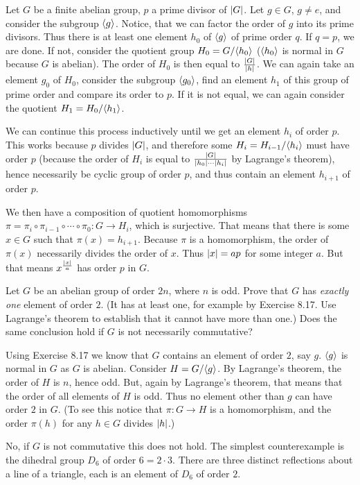 \begin{solution}
	Let $G$ be a finite abelian group, $p$ a prime divisor of $\left|G\right|$. Let $g \in G$, $g \neq e$, and consider the subgroup $\langle g \rangle$. Notice, that we can factor the order of $g$ into its prime divisors. Thus there is at least one element $h_0$ of $\langle g \rangle$ of prime order $q$. If $q = p$, we are done. If not, consider the quotient group $H_0 = G/\langle h_0 \rangle$ ($\langle h_0 \rangle$ is normal in $G$ because $G$ is abelian). The order of $H_0$ is then equal to $\frac{\left|G\right|}{\left|h\right|}$. We can again take an element $g_0$ of $H_0$, consider the subgroup $\langle g_0 \rangle$, find an element $h_1$ of this group of prime order and compare its order to $p$. If it is not equal, we can again consider the quotient $H_1 = H_0/\langle h_1 \rangle$. 
	
	We can continue this process inductively until we get an element $h_i$ of order $p$. This works because $p$ divides $\left|G\right|$, and therefore some $H_i = H_{i-1}/\langle h_i \rangle$ must have order $p$ (because the order of $H_i$ is equal to $\frac{\left|G\right|}{\left|h_0\right| \cdots \left|h_i\right|}$ by Lagrange's theorem), hence necessarily be cyclic group of order $p$, and thus contain an element $h_{i+1}$ of order $p$.
	
	We then have a composition of quotient homomorphisms $\pi = \pi_i \circ \pi_{i-1} \circ \cdots \circ \pi_0: G \to H_i$, which is surjective. That means that there is some $x \in G$ such that $\pi(x) = h_{i+1}$. Because $\pi$ is a homomorphism, the order of $\pi(x)$ necessarily divides the order of $x$. Thus $\left|x\right| = ap$ for some integer $a$. But that means $x^{\frac{\left|x\right|}{a}}$ has order $p$ in $G$.
\end{solution}

\begin{problem}
	Let $G$ be an abelian group of order $2n$, where $n$ is odd. Prove that $G$ has \emph{exactly one} element of order $2$. (It has at least one, for example by Exercise 8.17. Use Lagrange's theorem to establish that it cannot have more than one.) Does the same conclusion hold if $G$ is not necessarily commutative?
\end{problem}

\begin{solution}
	Using Exercise 8.17 we know that $G$ contains an element of order $2$, say $g$. $\langle g \rangle$ is normal in $G$ as $G$ is abelian. Consider $H = G/\langle g \rangle$. By Lagrange's theorem, the order of $H$ is $n$, hence odd. But, again by Lagrange's theorem, that means that the order of all elements of $H$ is odd. Thus no element other than $g$ can have order $2$ in $G$. (To see this notice that $\pi: G \to H$ is a homomorphism, and the order $\pi(h)$ for any $h \in G$ divides $\left|h\right|$.)
	
	No, if $G$ is not commutative this does not hold. The simplest counterexample is the dihedral group $D_6$ of order $6 = 2 \cdot 3$. There are three distinct reflections about a line of a triangle, each is an element of $D_6$ of order $2$.
\end{solution}

